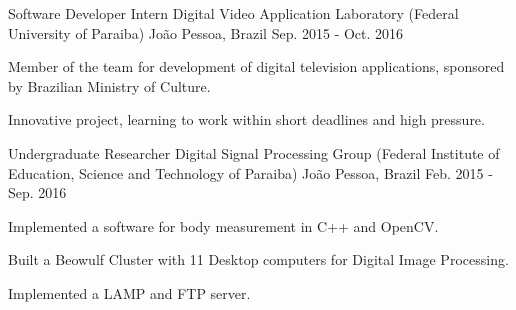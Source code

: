 \begin{cventries}
  \cventry
    {Software Developer Intern} %
    {Digital Video Application Laboratory (Federal University of Paraiba)} %
    {João Pessoa, Brazil} %
    {Sep. 2015 - Oct. 2016} %
    {
      \begin{cvitems} %
        \item {Member of the team for development of digital television applications, sponsored by Brazilian Ministry of Culture.}
        \item {Innovative project, learning to work within short deadlines and high pressure.}
      \end{cvitems}
    }
    
  \cventry
    {Undergraduate Researcher} %
    {Digital Signal Processing Group (Federal Institute of Education, Science and Technology of Paraiba)} %
    {João Pessoa, Brazil} %
    {Feb. 2015 - Sep. 2016} %
    {
      \begin{cvitems} %
        \item {Implemented a software for body measurement in C++ and OpenCV.}
        \item {Built a Beowulf Cluster with 11 Desktop computers for Digital Image Processing.}
        \item {Implemented a LAMP and FTP server.}
      \end{cvitems}
    }


\end{cventries}
